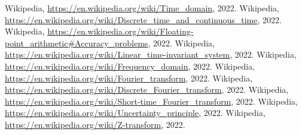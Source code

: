 \clearpage
{}
\begin{thebibliography}{9}
         Wikipedia, \underline{https://en.wikipedia.org/wiki/Time\_domain}, 2022.
         Wikipedia, \underline{https://en.wikipedia.org/wiki/Discrete\_time\_and\_continuous\_time}, 2022.
         Wikipedia, \underline{https://en.wikipedia.org/wiki/Floating-point\_arithmetic\#Accuracy\_problems}, 2022.
         Wikipedia, \underline{https://en.wikipedia.org/wiki/Linear\_time-invariant\_system}, 2022.
         Wikipedia, \underline{https://en.wikipedia.org/wiki/Frequency\_domain}, 2022.
         Wikipedia, \underline{https://en.wikipedia.org/wiki/Fourier\_transform}, 2022.
         Wikipedia, \underline{https://en.wikipedia.org/wiki/Discrete\_Fourier\_transform}, 2022.
         Wikipedia, \underline{https://en.wikipedia.org/wiki/Short-time\_Fourier\_transform}, 2022.
         Wikipedia, \underline{https://en.wikipedia.org/wiki/Uncertainty\_principle}, 2022.
         Wikipedia, \underline{https://en.wikipedia.org/wiki/Z-transform}, 2022.
\end{thebibliography}

